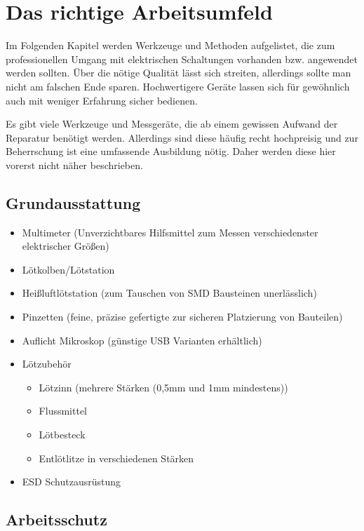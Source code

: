 \section{Das richtige Arbeitsumfeld}

Im Folgenden Kapitel werden Werkzeuge und Methoden aufgelistet, die zum professionellen Umgang mit elektrischen Schaltungen vorhanden bzw. angewendet werden sollten.
Über die nötige Qualität lässt sich streiten, allerdings sollte man nicht am falschen Ende sparen. Hochwertigere Geräte lassen sich für gewöhnlich auch mit weniger Erfahrung sicher bedienen.

Es gibt viele Werkzeuge und Messgeräte, die ab einem gewissen Aufwand der Reparatur benötigt werden. Allerdings sind diese häufig recht hochpreisig und zur Beherrschung ist eine umfassende Ausbildung nötig. Daher werden diese hier vorerst nicht näher beschrieben.

\subsection{Grundausstattung}

\begin{itemize}
	\item Multimeter (Unverzichtbares Hilfsmittel zum Messen verschiedenster elektrischer Größen)
	\item Lötkolben/Lötstation
	\item Heißluftlötstation (zum Tauschen von SMD Bausteinen unerlässlich)
	\item Pinzetten (feine, präzise gefertigte zur sicheren Platzierung von Bauteilen)
	\item Auflicht Mikroskop (günstige USB Varianten erhältlich)
	\item Lötzubehör
	\begin{itemize}
		\item Lötzinn (mehrere Stärken (0,5mm und 1mm mindestens))
		\item Flussmittel
		\item Lötbesteck
		\item Entlötlitze in verschiedenen Stärken
	\end{itemize}
	\item ESD Schutzausrüstung
\end{itemize}

\subsection{Arbeitsschutz}

